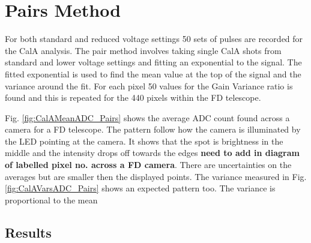 \section{Pairs Method}

For both standard and reduced voltage settings 50 sets of pulses are recorded for the CalA analysis. The pair method involves taking single CalA shots from standard and lower voltage settings and fitting an exponential to the signal. The fitted exponential is used to find the mean value at the top of the signal and the variance around the fit. For each pixel 50 values for the Gain Variance ratio is found and this is repeated for the 440 pixels within the FD telescope.

Fig. \ref{fig:CalAMeanADC_Pairs} shows the average ADC count found across a camera for a FD telescope. The pattern follow how the camera is illuminated by the LED pointing at the camera. It shows that the spot is brightness in the middle and the intensity drops off towards the edges \textbf{need to add in diagram of labelled pixel no. across a FD camera}. There are uncertainties on the averages but are smaller then the displayed points. The variance measured in Fig. \ref{fig:CalAVarsADC_Pairs} shows an expected pattern too. The variance is proportional to the mean

\subsection{Results}


